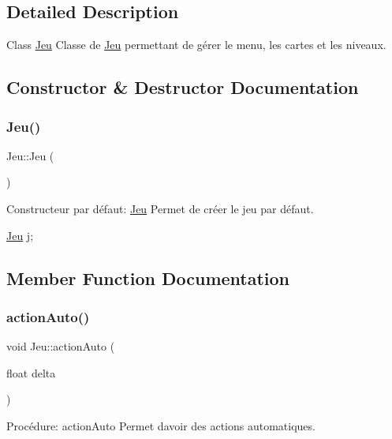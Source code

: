 \subsection{Detailed Description}
Class \hyperlink{classJeu}{Jeu} Classe de \hyperlink{classJeu}{Jeu} permettant de gérer le menu, les cartes et les niveaux. 

\subsection{Constructor \& Destructor Documentation}
\mbox{\label{classJeu_acc5795ee00edf75516d3dfe65be3e6d6}} 
\subsubsection{\texorpdfstring{Jeu()}{Jeu()}}
{\footnotesize\ttfamily Jeu\+::\+Jeu (\begin{DoxyParamCaption}{ }\end{DoxyParamCaption})}



Constructeur par défaut\+: \hyperlink{classJeu}{Jeu} Permet de créer le jeu par défaut. 


\begin{DoxyCode}
\hyperlink{classJeu}{Jeu} j;
\end{DoxyCode}
 

\subsection{Member Function Documentation}
\mbox{\label{classJeu_a8d2a0773d8edcb42d5e055785ad4b71a}} 
\subsubsection{\texorpdfstring{action\+Auto()}{actionAuto()}}
{\footnotesize\ttfamily void Jeu\+::action\+Auto (\begin{DoxyParamCaption}\item[{float}]{delta }\end{DoxyParamCaption})}



Procédure\+: action\+Auto Permet d\textquotesingle{}avoir des actions automatiques. 


